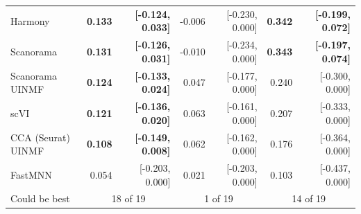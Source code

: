 \begin{tabular}{lrrrrrr}
Harmony & \textbf{0.133} & \textbf{[-0.124, 0.033]} & -0.006 & [-0.230, 0.000] & \textbf{0.342} & \textbf{[-0.199, 0.072]} \\
Scanorama & \textbf{0.131} & \textbf{[-0.126, 0.031]} & -0.010 & [-0.234, 0.000] & \textbf{0.343} & \textbf{[-0.197, 0.074]} \\
Scanorama UINMF & \textbf{0.124} & \textbf{[-0.133, 0.024]} & 0.047 & [-0.177, 0.000] & 0.240 & [-0.300, 0.000] \\
scVI & \textbf{0.121} & \textbf{[-0.136, 0.020]} & 0.063 & [-0.161, 0.000] & 0.207 & [-0.333, 0.000] \\
CCA (Seurat) UINMF & \textbf{0.108} & \textbf{[-0.149, 0.008]} & 0.062 & [-0.162, 0.000] & 0.176 & [-0.364, 0.000] \\
FastMNN & 0.054 & [-0.203, 0.000] & 0.021 & [-0.203, 0.000] & 0.103 & [-0.437, 0.000] \\
\midrule
Could be best & \multicolumn{2}{c}{18 of 19} & \multicolumn{2}{c}{1 of 19} & \multicolumn{2}{c}{14 of 19} \\
\bottomrule
\end{tabular}
